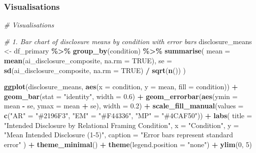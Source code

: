 \documentclass[
]{article}
\newenvironment{Shaded}{\begin{snugshade}}{\end{snugshade}}
\newcommand{\AttributeTok}[1]{\textcolor[rgb]{0.13,0.29,0.53}{#1}}
\newcommand{\CommentTok}[1]{\textcolor[rgb]{0.56,0.35,0.01}{\textit{#1}}}
\newcommand{\ConstantTok}[1]{\textcolor[rgb]{0.56,0.35,0.01}{#1}}
\newcommand{\DecValTok}[1]{\textcolor[rgb]{0.00,0.00,0.81}{#1}}
\newcommand{\FloatTok}[1]{\textcolor[rgb]{0.00,0.00,0.81}{#1}}
\newcommand{\FunctionTok}[1]{\textcolor[rgb]{0.13,0.29,0.53}{\textbf{#1}}}
\newcommand{\NormalTok}[1]{#1}
\newcommand{\OtherTok}[1]{\textcolor[rgb]{0.56,0.35,0.01}{#1}}
\newcommand{\SpecialCharTok}[1]{\textcolor[rgb]{0.81,0.36,0.00}{\textbf{#1}}}
\newcommand{\StringTok}[1]{\textcolor[rgb]{0.31,0.60,0.02}{#1}}
\begin{document}
\subsubsection{Visualisations}\label{visualisations}

\begin{Shaded}
\begin{Highlighting}[]
\CommentTok{\# Visualisations}

\CommentTok{\# 1. Bar chart of disclosure means by condition with error bars}
\NormalTok{disclosure\_means }\OtherTok{\textless{}{-}}\NormalTok{ df\_primary }\SpecialCharTok{\%\textgreater{}\%}
  \FunctionTok{group\_by}\NormalTok{(condition) }\SpecialCharTok{\%\textgreater{}\%}
  \FunctionTok{summarise}\NormalTok{(}
    \AttributeTok{mean =} \FunctionTok{mean}\NormalTok{(ai\_disclosure\_composite, }\AttributeTok{na.rm =} \ConstantTok{TRUE}\NormalTok{),}
    \AttributeTok{se   =} \FunctionTok{sd}\NormalTok{(ai\_disclosure\_composite, }\AttributeTok{na.rm =} \ConstantTok{TRUE}\NormalTok{) }\SpecialCharTok{/} \FunctionTok{sqrt}\NormalTok{(}\FunctionTok{n}\NormalTok{())}
\NormalTok{  )}

\FunctionTok{ggplot}\NormalTok{(disclosure\_means, }\FunctionTok{aes}\NormalTok{(}\AttributeTok{x =}\NormalTok{ condition, }\AttributeTok{y =}\NormalTok{ mean, }\AttributeTok{fill =}\NormalTok{ condition)) }\SpecialCharTok{+}
  \FunctionTok{geom\_bar}\NormalTok{(}\AttributeTok{stat =} \StringTok{"identity"}\NormalTok{, }\AttributeTok{width =} \FloatTok{0.6}\NormalTok{) }\SpecialCharTok{+}
  \FunctionTok{geom\_errorbar}\NormalTok{(}\FunctionTok{aes}\NormalTok{(}\AttributeTok{ymin =}\NormalTok{ mean }\SpecialCharTok{{-}}\NormalTok{ se, }\AttributeTok{ymax =}\NormalTok{ mean }\SpecialCharTok{+}\NormalTok{ se), }\AttributeTok{width =} \FloatTok{0.2}\NormalTok{) }\SpecialCharTok{+}
  \FunctionTok{scale\_fill\_manual}\NormalTok{(}\AttributeTok{values =} \FunctionTok{c}\NormalTok{(}\StringTok{"AR"} \OtherTok{=} \StringTok{"\#2196F3"}\NormalTok{, }\StringTok{"EM"} \OtherTok{=} \StringTok{"\#F44336"}\NormalTok{, }\StringTok{"MP"} \OtherTok{=} \StringTok{"\#4CAF50"}\NormalTok{)) }\SpecialCharTok{+}
  \FunctionTok{labs}\NormalTok{(}
    \AttributeTok{title =} \StringTok{"Intended Disclosure by Relational Framing Condition"}\NormalTok{,}
    \AttributeTok{x =} \StringTok{"Condition"}\NormalTok{,}
    \AttributeTok{y =} \StringTok{"Mean Intended Disclosure (1{-}5)"}\NormalTok{,}
    \AttributeTok{caption =} \StringTok{"Error bars represent standard error"}
\NormalTok{  ) }\SpecialCharTok{+}
  \FunctionTok{theme\_minimal}\NormalTok{() }\SpecialCharTok{+}
  \FunctionTok{theme}\NormalTok{(}\AttributeTok{legend.position =} \StringTok{"none"}\NormalTok{) }\SpecialCharTok{+}
  \FunctionTok{ylim}\NormalTok{(}\DecValTok{0}\NormalTok{, }\DecValTok{5}\NormalTok{)}
\end{Highlighting}
\end{Shaded}
\end{document}
